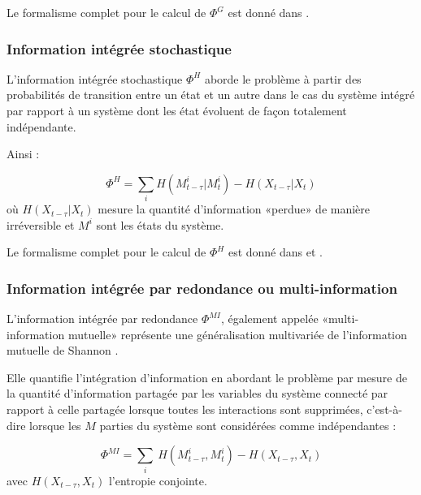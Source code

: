 Le formalisme complet pour le calcul de $\Phi^G$ est donné dans \cite{oizumi2016unified}.

\subsubsection*{Information intégrée stochastique}
\label{phih}

L'information intégrée stochastique $\Phi^H$ aborde le problème à partir des probabilités de transition entre un état et un autre dans le cas du système intégré par rapport à un système dont les état évoluent de façon totalement indépendante. 

Ainsi : 

\begin{equation}
\Phi^H = \sum_i H(M_{t-\tau}^i | M_t^i) - H(X_{t-\tau}|X_t)
\end{equation}
où $H(X_{t-\tau}|X_t)$ mesure la quantité d'information «perdue» de manière irréversible et $M^i$ sont les états du système. 

Le formalisme complet pour le calcul de $\Phi^H$ est donné dans \cite{kitazono2018efficient} et \cite{mediano2019measuring}. 

\subsubsection*{Information intégrée par redondance ou multi-information}
\label{phimi}

L'information intégrée par redondance $\Phi^{MI}$, également appelée «multi-information mutuelle» \citep{amari2001information, ay2015information} représente une généralisation multivariée de l'information mutuelle de Shannon \cite{mcgill1954multivariate, shannon1948}. 

Elle quantifie l'intégration d'information en abordant le problème par mesure de la quantité d'information partagée par les variables du système connecté par rapport à celle partagée lorsque toutes les interactions sont supprimées, c'est-à-dire lorsque les $M$ parties du système sont considérées comme indépendantes \citep{kitazono2018efficient} :

\begin{equation}
\Phi^{MI} = \sum_i~H(M_{t-\tau}^i,M_t^i)-H(X_{t-\tau},X_t)
\end{equation}
avec $H(X_{t-\tau},X_t)$ l'entropie conjointe. 

